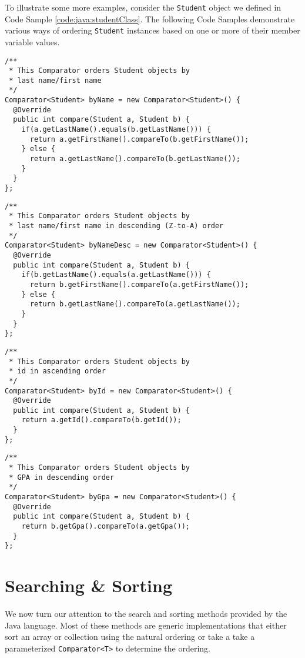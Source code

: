To illustrate some more examples, consider the \texttt{Student} 
object we defined in Code Sample \ref{code:java:studentClass}.  The following 
Code Samples demonstrate various ways of ordering \texttt{Student} 
instances based on one or more of their member variable values.

\begin{verbatim}
/**
 * This Comparator orders Student objects by 
 * last name/first name
 */
Comparator<Student> byName = new Comparator<Student>() {
  @Override
  public int compare(Student a, Student b) {
    if(a.getLastName().equals(b.getLastName())) {
      return a.getFirstName().compareTo(b.getFirstName());
    } else {
      return a.getLastName().compareTo(b.getLastName());
    }
  }
};
\end{verbatim}

\begin{verbatim}
/**
 * This Comparator orders Student objects by 
 * last name/first name in descending (Z-to-A) order
 */
Comparator<Student> byNameDesc = new Comparator<Student>() {
  @Override
  public int compare(Student a, Student b) {
    if(b.getLastName().equals(a.getLastName())) {
      return b.getFirstName().compareTo(a.getFirstName());
    } else {
      return b.getLastName().compareTo(a.getLastName());
    }
  }
};
\end{verbatim}

\begin{verbatim}
/**
 * This Comparator orders Student objects by 
 * id in ascending order
 */
Comparator<Student> byId = new Comparator<Student>() {
  @Override
  public int compare(Student a, Student b) {
  	return a.getId().compareTo(b.getId());
  }
};
\end{verbatim}

\begin{verbatim}
/**
 * This Comparator orders Student objects by 
 * GPA in descending order
 */
Comparator<Student> byGpa = new Comparator<Student>() {
  @Override
  public int compare(Student a, Student b) {
  	return b.getGpa().compareTo(a.getGpa());
  }
};
\end{verbatim}

\section{Searching \& Sorting}

We now turn our attention to the search and sorting methods provided by
the Java language.  Most of these methods are generic implementations 
that either sort an array or collection using the natural ordering or 
take a take a parameterized \texttt{Comparator<T>} to determine
the ordering.

